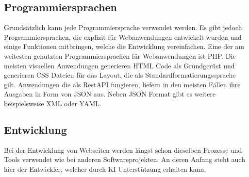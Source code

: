 \subsection{Programmiersprachen}
Grundsätzlich kann jede Programmiersprache verwendet werden. Es gibt jedoch Programmiersprachen, die explizit für Webanwendungen entwickelt wurden und einige Funktionen mitbringen, welche die Entwicklung vereinfachen. Eine der am weitesten genutzten Programmiersprachen für Webanwendungen ist PHP. Die meisten visuellen Anwendungen generieren HTML Code als Grundgerüst und generieren CSS Dateien für das Layout, die als Standardformatierungssprache gilt. Anwendungen die als RestAPI fungieren, liefern in den meisten Fällen ihre Ausgaben in Form von JSON aus. Neben JSON Format gibt es weitere beispielsweise XML oder YAML.\vspace{0.2cm}


\subsection{Entwicklung}
Bei der Entwicklung von Webseiten werden längst schon dieselben Prozesse und Tools verwendet wie bei anderen Softwareprojekten.
An deren Anfang steht auch hier der Entwickler, welcher durch KI Unterstützung erhalten kann.


